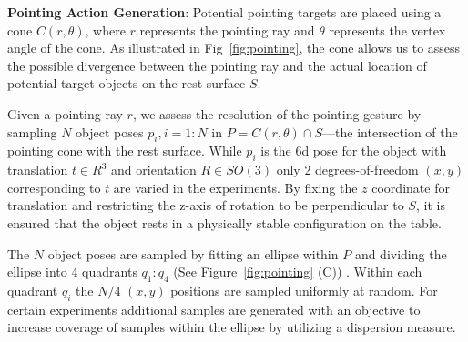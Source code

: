 


\noindent\textbf{Pointing Action Generation}: Potential pointing targets are placed using a cone $C(r, \theta)$, where $r$ represents the pointing ray and $\theta$ represents the vertex angle of the cone. As illustrated in Fig~\ref{fig:pointing}, the cone allows us to assess the possible divergence between the pointing ray and the actual location of potential target objects on the rest surface $S$. 

Given a pointing ray $r$, we assess the resolution of the pointing gesture by sampling $N$ object poses $p_i, i=1:N$ in $P=C(r, \theta) \cap S$---the intersection of the pointing cone with the rest surface.  While $p_i$ is the 6d pose for the object with translation $t \in R^3$ and orientation $R \in SO(3)$ only 2  degrees-of-freedom $(x, y)$ corresponding to $t$ are varied in the experiments. By fixing the $z$ coordinate for translation and restricting the z-axis of rotation to be perpendicular to $S$, it is ensured that the object rests in a physically stable configuration on the table.

The $N$ object poses are sampled by fitting an ellipse within $P$ and dividing the ellipse into 4 quadrants $q_1:q_4$ (See Figure~\ref{fig:pointing} (C)) . Within each quadrant $q_i$ the $N/4$ $(x,y)$ positions are sampled uniformly at random. For certain experiments additional samples are generated with an objective to increase coverage of samples within the ellipse by utilizing a dispersion measure.

